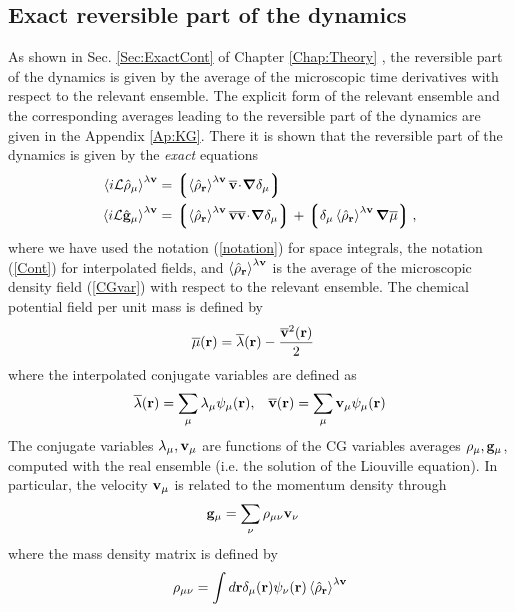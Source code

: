 \documentclass[b5paper,openright,10pt]{book}
\newcommand{\esc}{\!\cdot\!}
\newcommand{\llangle}{\left\langle}
\newcommand{\rrangle}{\right\rangle}
\newcommand{\llg}{\left\lgroup}
\newcommand{\rlg}{\right\rgroup}
\begin{document}
\subsection{Exact reversible part of the dynamics}
As shown in Sec. \ref{Sec:ExactCont} of Chapter \ref{Chap:Theory} , the reversible part
of  the dynamics  is  given by  the average  of  the microscopic  time
derivatives with respect to the  relevant ensemble.  The explicit form
of the relevant ensemble and the corresponding averages leading to the
reversible  part   of  the   dynamics  are   given  in   the  Appendix
\ref{Ap:KG}.  There  it is  shown  that  the  reversible part  of  the
dynamics is given by the \textit{exact} equations
\begin{align}
  \llangle i{\cal L}\hat{\rho}_\mu\rrangle^{\lambda{\bf v}} &=
  \llg\llangle \hat{\rho}_{\bf r}\rrangle^{\lambda{\bf v}}
\overline{\bf v}\esc\boldsymbol{\nabla}\delta_{\mu}\rlg
\nonumber\\
  \llangle i{\cal L}\hat{\bf g}_\mu\rrangle^{\lambda{\bf v}} &=
\llg\llangle \hat{\rho}_{\bf r}\rrangle^{\lambda{\bf v}}
\overline{\bf v}\overline{\bf v}\esc\boldsymbol{\nabla}\delta_{\mu}\rlg
+\llg\delta_\mu\llangle\hat{\rho}_{\bf r}\rrangle^{\lambda{\bf v}}\boldsymbol{\nabla}\overline{\mu}\rlg,
\label{ExactRev}
\end{align}
where we have used the  notation (\ref{notation}) for space integrals,
the  notation  (\ref{Cont})  for interpolated  fields,  and  $\llangle
\hat{\rho}_{\bf  r}\rrangle^{\lambda{\bf v}}$  is the  average of  the
microscopic  density field  (\ref{CGvar})  with  respect to  the
relevant  ensemble.  The  chemical potential  field per  unit mass  is
defined by
\begin{align}
  \overline{\mu}({\bf r})&=\overline{\lambda}({\bf r})-\frac{\overline{\bf v}^2({\bf r})}{2}
\end{align}
where the interpolated conjugate variables are defined as 
\begin{align}
    \overline{\lambda}({\bf r})=\sum_{\mu}{\lambda}_{\mu}\psi_\mu({\bf r}), &&
\overline{\bf v}({\bf r})=\sum_{\mu}{\bf v}_{\mu}\psi_\mu({\bf r})
\end{align}
The conjugate variables $\lambda_\mu,{\bf v}_\mu$ are functions of the
CG variables averages $\rho_\mu,{\bf g}_\mu$, computed with the real ensemble (i.e. the solution of the Liouville equation). In particular, the velocity ${\bf
v}_\mu$ is related to the momentum density through
\begin{align}
  {\bf g}_\mu&=\sum_{\nu}\rho_{\mu\nu}{\bf v}_\nu
\label{vnu}
\end{align}
where  the mass density matrix is defined by
\begin{align}
  \rho_{\mu\nu} =\int d{\bf r}
\delta_\mu({\bf r})\psi_\nu({\bf r})\llangle\hat{\rho}_{\bf r}\rrangle^{\lambda{\bf v}}
\label{rhomunu}
\end{align}
\end{document}
